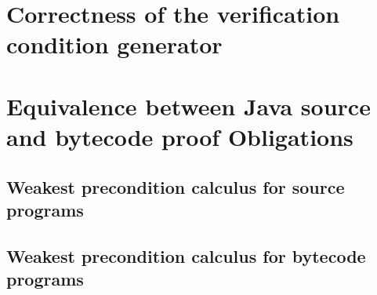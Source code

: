 \documentclass[book,10pt]{book}
\begin{document}
\chapter{Correctness of the verification condition generator}\label{proofGeneral}
  
  
  
  



\chapter{Equivalence between Java source and bytecode proof Obligations}\label{pogEquiv}
       
       

       
   
   
	 

       
        
        
        
       


	 
       \section{Weakest precondition calculus for source programs}\label{pog:wpSrcGeneral}
           
	  	  
	  
	  

       \section{Weakest precondition calculus for bytecode programs}\label{pog:wpBcGeneral}
          
	  
	   




\end{document}
